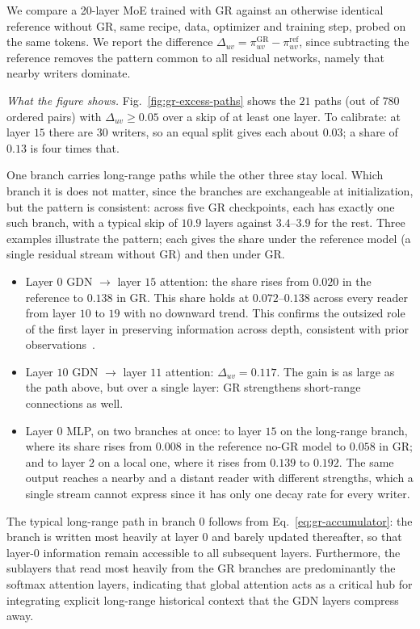 We compare a 20-layer MoE trained with GR against an otherwise identical reference without GR, same recipe, data, optimizer and training step, probed on the same tokens. 
We report the difference
$\Delta_{uv}=\pi^{\mathrm{GR}}_{uv}-\pi^{\mathrm{ref}}_{uv}$, since
subtracting the reference removes the pattern common to all residual networks,
namely that nearby writers dominate. 


\emph{What the figure shows.}
Fig.~\ref{fig:gr-excess-paths} shows the $21$ paths (out of $780$ ordered
pairs) with $\Delta_{uv}\ge 0.05$ over a skip of at least one layer. To
calibrate: at layer $15$ there are $30$ writers, so an equal split gives
each about $0.03$; a share of $0.13$ is four times that.

One branch carries long-range paths while the other three stay local. Which
branch it is does not matter, since the branches are exchangeable at
initialization, but the pattern is consistent: across five GR checkpoints,
each has exactly one such branch, with a typical skip of $10.9$ layers
against $3.4$--$3.9$ for the rest. Three examples illustrate the pattern;
each gives the share under the reference model (a single residual stream
without GR) and then under GR.
\begin{itemize}[leftmargin=1.5em]
\item Layer $0$ GDN $\to$ layer $15$ attention: the share rises from $0.020$ in the reference to $0.138$ in GR. 
    This share holds at $0.072$--$0.138$ across every reader
  from layer $10$ to $19$ with no downward trend.
  This confirms the outsized role of the first layer in preserving information across depth, consistent with prior observations~\citep{elhage2021mathematical,men2024shortgpt}.
\item Layer $10$ GDN $\to$ layer $11$ attention:
  $\Delta_{uv}=0.117$. The gain is as large as the path above, but over a single layer: GR strengthens short-range connections as well.
\item Layer $0$ MLP, on two branches at once: to layer $15$ on the long-range branch, where its share rises from $0.008$ in the reference no-GR model to $0.058$ in GR; and to layer $2$ on a local one, where it rises from $0.139$ to $0.192$.
The same output reaches a nearby and a distant reader with different strengths, which a single stream cannot express since it has only one decay rate for every writer.
\end{itemize}

The typical long-range path in branch 0 follows from Eq.~\eqref{eq:gr-accumulator}: the branch is written most heavily at layer 0 and barely updated thereafter, so that layer-0 information remain accessible to all subsequent layers.
Furthermore, the sublayers that read most heavily from the GR branches are predominantly the softmax attention layers, indicating that global attention acts as a critical hub for integrating explicit long-range historical context that the GDN layers compress away.

